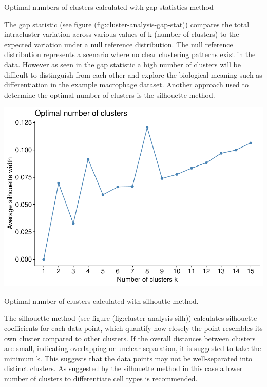 \documentclass[
  11pt,
]{article}
\let\origfigure\figure
\begin{document}
\caption{Optimal numbers of clusters calculated with gap statistics method}\label{fig:cluster-analysis-gap-stat}
 \endfigure\egroup

The gap statistic (see figure (fig:cluster-analysis-gap-stat)) compares the total intracluster variation across various values of k (number of clusters) to the expected variation under a null reference distribution. The null reference distribution represents a scenario where no clear clustering patterns exist in the data. However as seen in the gap statistic a high number of clusters will be difficult to distinguish from each other and explore the biological meaning such as differentiation in the example macrophage dataset.
Another approach used to determine the optimal number of clusters is the silhouette method.

\bgroup  \origfigure[H] 

{\centering \includegraphics[width=0.9\linewidth]{Thesis_files/figure-latex/cluster-analysis-silh-1} 

}

\caption{Optimal number of clusters calculated with silhoutte method.}\label{fig:cluster-analysis-silh}
 \endfigure\egroup

The silhouette method (see figure (fig:cluster-analysis-silh)) calculates silhouette coefficients for each data point, which quantify how closely the point resembles its own cluster compared to other clusters.
If the overall distances between clusters are small, indicating overlapping or unclear separation, it is suggested to take the minimum k. This suggests that the data points may not be well-separated into distinct clusters. As suggested by the silhouette method in this case a lower number of clusters to differentiate cell types is recommended.
\end{document}
